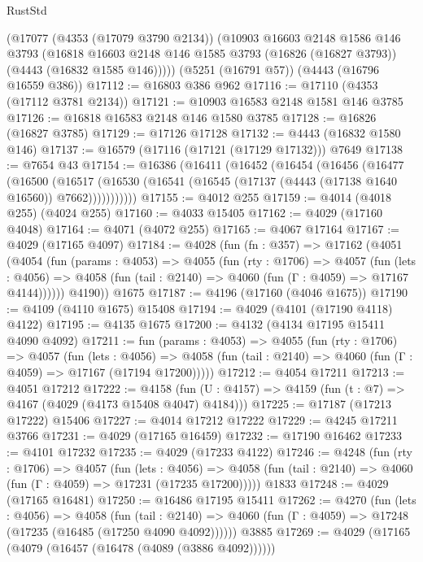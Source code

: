 \begin{lexlean}{RustStd}
\begin{coremodule}
    (@17077
      (@4353 (@17079 @3790 @2134))
      (@10903
        @16603
        @2148
        @1586
        @146
        @3793
        (@16818 @16603 @2148 @146 @1585 @3793 (@16826 (@16827 @3793)) (@4443 (@16832 @1585 @146)))))
    (@5251 (@16791 @57))
    (@4443 (@16796 @16559 @386))
@17112 := @16803 @386 @962
@17116 := @17110 (@4353 (@17112 @3781 @2134))
@17121 := @10903 @16583 @2148 @1581 @146 @3785
@17126 := @16818 @16583 @2148 @146 @1580 @3785
@17128 := @16826 (@16827 @3785)
@17129 := @17126 @17128
@17132 := @4443 (@16832 @1580 @146)
@17137 := @16579 (@17116 (@17121 (@17129 @17132))) @7649
@17138 := @7654 @43
@17154 := @16386
    (@16411
      (@16452
        (@16454
          (@16456
            (@16477
              (@16500
                (@16517
                  (@16530 (@16541 (@16545 (@17137 (@4443 (@17138 @1640 @16560)) @7662)))))))))))
@17155 := @4012 @255
@17159 := @4014 (@4018 @255) (@4024 @255)
@17160 := @4033 @15405
@17162 := @4029 (@17160 @4048)
@17164 := @4071 (@4072 @255)
@17165 := @4067 @17164
@17167 := @4029 (@17165 @4097)
@17184 := @4028
    (fun (fn : @357) =>
    @17162
      (@4051
        (@4054
          (fun (params : @4053) =>
          @4055
            (fun (rty : @1706) =>
            @4057
              (fun (lets : @4056) =>
              @4058 (fun (tail : @2140) => @4060 (fun (Γ : @4059) => @17167 @4144))))))
        @4190))
    @1675
@17187 := @4196 (@17160 (@4046 @1675))
@17190 := @4109 (@4110 @1675) @15408
@17194 := @4029 (@4101 (@17190 @4118) @4122)
@17195 := @4135 @1675
@17200 := @4132 (@4134 @17195 @15411 @4090 @4092)
@17211 := fun (params : @4053) =>
  @4055
    (fun (rty : @1706) =>
    @4057
      (fun (lets : @4056) =>
      @4058 (fun (tail : @2140) => @4060 (fun (Γ : @4059) => @17167 (@17194 @17200)))))
@17212 := @4054 @17211
@17213 := @4051 @17212
@17222 := @4158
    (fun (U : @4157) => @4159 (fun (t : @7) => @4167 (@4029 (@4173 @15408 @4047) @4184)))
@17225 := @17187 (@17213 @17222) @15406
@17227 := @4014 @17212 @17222
@17229 := @4245 @17211 @3766
@17231 := @4029 (@17165 @16459)
@17232 := @17190 @16462
@17233 := @4101 @17232
@17235 := @4029 (@17233 @4122)
@17246 := @4248
    (fun (rty : @1706) =>
    @4057
      (fun (lets : @4056) =>
      @4058 (fun (tail : @2140) => @4060 (fun (Γ : @4059) => @17231 (@17235 @17200)))))
    @1833
@17248 := @4029 (@17165 @16481)
@17250 := @16486 @17195 @15411
@17262 := @4270
    (fun (lets : @4056) =>
    @4058
      (fun (tail : @2140) =>
      @4060 (fun (Γ : @4059) => @17248 (@17235 (@16485 (@17250 @4090 @4092))))))
    @3885
@17269 := @4029 (@17165 (@4079 (@16457 (@16478 (@4089 (@3886 @4092))))))

\end{coremodule}
\end{lexlean}
